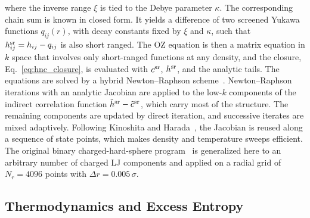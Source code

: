 \documentclass[aps,pre,twocolumn,superscriptaddress,floatfix]{revtex4-2}
\begin{document}
where the inverse range $\xi$ is tied to the Debye parameter $\kappa$. The corresponding chain sum is known in closed form. It yields a difference of two screened Yukawa functions $q_{ij}(r)$, with decay constants fixed by $\xi$ and $\kappa$, such that $h_{ij}^{\rm sr}=h_{ij}-q_{ij}$ is also short ranged. The OZ equation is then a matrix equation in $k$ space that involves only short-ranged functions at any density, and the closure, Eq.~\eqref{eq:hnc_closure}, is evaluated with $c^{\rm sr}$, $h^{\rm sr}$, and the analytic tails. The equations are solved by a hybrid Newton--Raphson scheme~\cite{LombaHoye1992,Labik1985}. Newton--Raphson iterations with an analytic Jacobian are applied to the low-$k$ components of the indirect correlation function $\tilde h^{\rm sr}-\tilde c^{\rm sr}$, which carry most of the structure. The remaining components are updated by direct iteration, and successive iterates are mixed adaptively. Following Kinoshita and Harada~\cite{Kinoshita1988}, the Jacobian is reused along a sequence of state points, which makes density and temperature sweeps efficient. The original binary charged-hard-sphere program~\cite{LombaHoye1992} is generalized here to an arbitrary number of charged LJ components and applied on a radial grid of $N_r = 4096$ points with $\Delta r = 0.005\,\sigma$.

\subsection{Thermodynamics and Excess Entropy}
\end{document}
